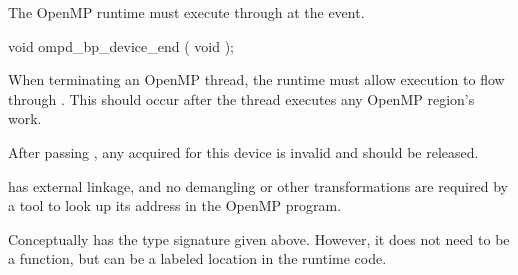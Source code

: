\summary
The OpenMP runtime must execute through
 at the  event.


\begin{cspecific}
\begin{ompSyntax}
void ompd_bp_device_end ( void );
\end{ompSyntax}
\end{cspecific}


\descr

When terminating an OpenMP thread, the runtime must allow execution
to flow through .
This should occur after the thread executes any OpenMP region's work.

After passing , any  acquired for this
device is invalid and should be released.

\restrictions

 has external  linkage, and no
demangling or other transformations are required by a tool
to look up its address in the OpenMP program.

Conceptually  has the type signature
given above.
However, it does not need to be a function, but can be a labeled location
in the runtime code.


